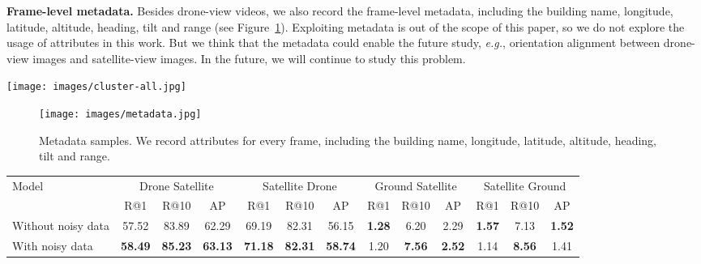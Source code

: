 \documentclass[sigconf]{acmart}
\def\eg{\emph{e.g.}}
\begin{document}
\noindent\textbf{Frame-level metadata.} Besides drone-view videos, we also record the frame-level metadata, including the building name, longitude, latitude, altitude, heading, tilt and range (see Figure~\ref{fig:metadata}). Exploiting metadata is out of the scope of this paper, so we do not explore the usage of attributes in this work. But we think that the metadata could enable the future study, \eg, orientation alignment between drone-view images and satellite-view images. In the future, we will continue to study this problem.





\begin{figure*}[t]
\begin{center}
    \texttt{[image: images/cluster-all.jpg]}
\end{center}
\caption{Visualization of cross-view features using t-SNE \cite{van2014accelerating} on University-1652. (Best viewed when zoomed in.)
     }\label{fig:cluster}
\end{figure*}

\begin{figure}[t]
\begin{center}
    \texttt{[image: images/metadata.jpg]}
\end{center}
\caption{Metadata samples. We record attributes for every frame, including the building name, longitude, latitude, altitude, heading, tilt and range. }\label{fig:metadata}
\end{figure}

\setlength{\tabcolsep}{7pt}
\begin{table*}
\small
\begin{center}
\begin{tabular}{l|ccc|ccc|ccc|ccc}
\hline
\multirow{2}{*}{Model} & \multicolumn{3}{c|}{Drone  Satellite} & \multicolumn{3}{c|}{Satellite  Drone} & \multicolumn{3}{c|}{Ground  Satellite} & 
\multicolumn{3}{c}{Satellite  Ground}\\
  & R@1 & R@10 & AP & R@1 & R@10 & AP & R@1 & R@10 & AP & R@1 & R@10 & AP \\
\shline
Without noisy data  & 57.52 & 83.89 & 62.29 & 69.19 & 82.31 & 56.15 & \textbf{1.28} & 6.20 & 2.29& \textbf{1.57} & 7.13 & \textbf{1.52}\\
With noisy data & \textbf{58.49} & \textbf{85.23} &  \textbf{63.13} & \textbf{71.18} & \textbf{82.31} & \textbf{58.74} & 1.20 & \textbf{7.56} & \textbf{2.52} & 1.14 & \textbf{8.56} & 1.41 \\
\hline
\end{tabular}
\end{center}
\caption{Ablation study. With / without noisy training data from Google Image. The baseline model trained with the Google Image data is generally better in all four tasks. The result also verifies that our baseline method could perform well against the noise in the dataset.
}
\label{table:Google}
\end{table*}
\end{document}
